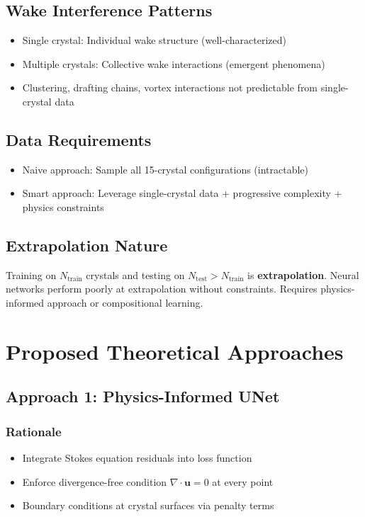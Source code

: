 \subsection{Wake Interference Patterns}
\begin{itemize}
    \item Single crystal: Individual wake structure (well-characterized)
    \item Multiple crystals: Collective wake interactions (emergent phenomena)
    \item Clustering, drafting chains, vortex interactions not predictable from single-crystal data
\end{itemize}

\subsection{Data Requirements}
\begin{itemize}
    \item Naive approach: Sample all 15-crystal configurations (intractable)
    \item Smart approach: Leverage single-crystal data + progressive complexity + physics constraints
\end{itemize}

\subsection{Extrapolation Nature}
Training on $N_{\text{train}}$ crystals and testing on $N_{\text{test}} > N_{\text{train}}$ is \textbf{extrapolation}. Neural networks perform poorly at extrapolation without constraints. Requires physics-informed approach or compositional learning.

\section{Proposed Theoretical Approaches}

\subsection{Approach 1: Physics-Informed UNet}

\subsubsection{Rationale}
\begin{itemize}
    \item Integrate Stokes equation residuals into loss function
    \item Enforce divergence-free condition $\nabla \cdot \mathbf{u} = 0$ at every point
    \item Boundary conditions at crystal surfaces via penalty terms
\end{itemize}

